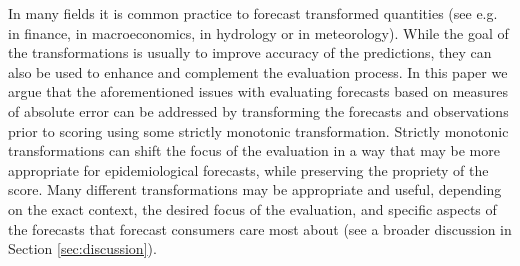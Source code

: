 \documentclass{article}
\begin{document}


In many fields it is common practice to forecast transformed quantities (see e.g. \cite{taylorEvaluatingVolatilityInterval1999} in finance, \cite{mayrLogLevelVAR2015} in macroeconomics, \cite{loweStochasticRainfallrunoffForecasting2014} in hydrology or \cite{fuglstadDoesNonstationarySpatial2015} in meteorology). While the goal of the transformations is usually to improve accuracy of the predictions, they can also be used to enhance and complement the evaluation process. 
In this paper we argue that the aforementioned issues with evaluating forecasts based on measures of absolute error can be addressed by transforming the forecasts and observations prior to scoring using some strictly monotonic transformation. Strictly monotonic transformations can shift the focus of the evaluation in a way that may be more appropriate for epidemiological forecasts, while preserving the propriety of the score. Many different transformations may be appropriate and useful, depending on the exact context, the desired focus of the evaluation, and specific aspects of the forecasts that forecast consumers care most about (see a broader discussion in Section \ref{sec:discussion}). 
\end{document}
